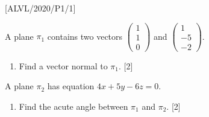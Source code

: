 \item {[}ALVL/2020/P1/1{]}

A plane $\pi_{1}$ contains two vectors $\left(\begin{array}{c}
1\\
1\\
0
\end{array}\right)$ and $\left(\begin{array}{c}
1\\
-5\\
-2
\end{array}\right)$. 
\begin{enumerate}
\item Find a vector normal to $\pi_{1}$. \hfill{}{[}2{]}
\end{enumerate}
A plane $\pi_{2}$ has equation $4x+5y-6z=0$. 
\begin{enumerate}
\item Find the acute angle between $\pi_{1}$ and $\pi_{2}$. \hfill{}{[}2{]}
\end{enumerate}
